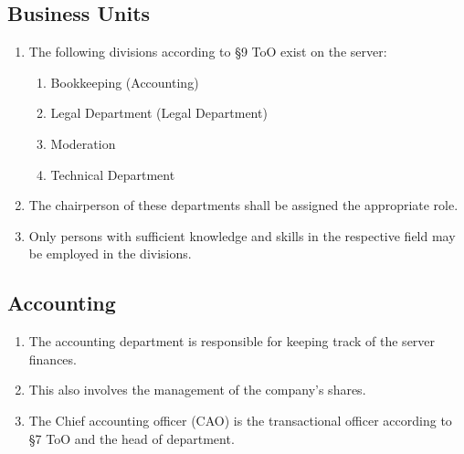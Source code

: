 \documentclass{article}
\begin{document}
\subsection{Business Units}
\begin{enumerate}[(1)]
	\item The following divisions according to §9 ToO exist on the server:
		\begin{enumerate}[(1)]
			\item Bookkeeping (Accounting)
			\item Legal Department (Legal Department)
			\item Moderation
			\item Technical Department
		\end{enumerate}
	\item The chairperson of these departments shall be assigned the appropriate role.
	\item Only persons with sufficient knowledge and skills in the respective field may be employed in the divisions.
\end{enumerate}

\subsection{Accounting}
\begin{enumerate}[(1)]
	\item The accounting department is responsible for keeping track of the server finances.
	\item This also involves the management of the company's shares.
	\item The Chief accounting officer (CAO) is the transactional officer according to §7 ToO and the head of department.
\end{enumerate}
\end{document}
